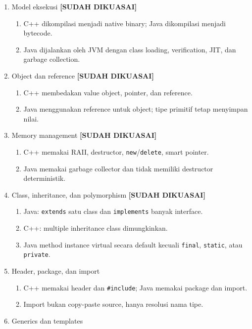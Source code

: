 \begin{enumerate}
    \item Model eksekusi \textbf{[SUDAH DIKUASAI]}
    \begin{enumerate}
        \item C++ dikompilasi menjadi native binary; Java dikompilasi menjadi bytecode.
        \item Java dijalankan oleh JVM dengan class loading, verification, JIT, dan garbage collection.
    \end{enumerate}
    \item Object dan reference \textbf{[SUDAH DIKUASAI]}
    \begin{enumerate}
        \item C++ membedakan value object, pointer, dan reference.
        \item Java menggunakan reference untuk object; tipe primitif tetap menyimpan nilai.
    \end{enumerate}
    \item Memory management \textbf{[SUDAH DIKUASAI]}
    \begin{enumerate}
        \item C++ memakai RAII, destructor, \texttt{new}/\texttt{delete}, smart pointer.
        \item Java memakai garbage collector dan tidak memiliki destructor deterministik.
    \end{enumerate}
    \item Class, inheritance, dan polymorphism \textbf{[SUDAH DIKUASAI]}
    \begin{enumerate}
        \item Java: \texttt{extends} satu class dan \texttt{implements} banyak interface.
        \item C++: multiple inheritance class dimungkinkan.
        \item Java method instance virtual secara default kecuali \texttt{final}, \texttt{static}, atau \texttt{private}.
    \end{enumerate}
    \item Header, package, dan import
    \begin{enumerate}
        \item C++ memakai header dan \texttt{\#include}; Java memakai package dan import.
        \item Import bukan copy-paste source, hanya resolusi nama tipe.
    \end{enumerate}
    \item Generics dan templates

\end{enumerate}

